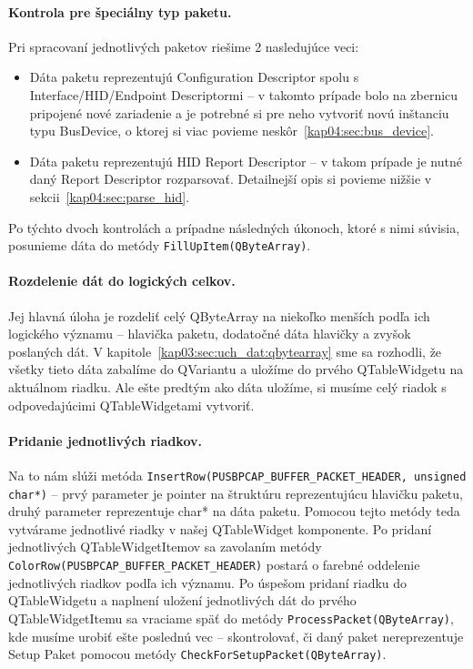 \paragraph{Kontrola pre špeciálny typ paketu.}
\hfill \break
Pri spracovaní jednotlivých paketov riešime 2 nasledujúce veci:
\begin{itemize}
\item Dáta paketu reprezentujú Configuration Descriptor spolu s Interface/HID/Endpoint Descriptormi -- v takomto prípade bolo na zbernicu pripojené nové zariadenie a je potrebné si pre neho vytvoriť novú inštanciu typu BusDevice, o ktorej si viac povieme neskôr~\ref{kap04:sec:bus_device}.
\item Dáta paketu reprezentujú HID Report Descriptor -- v takom prípade je nutné daný Report Descriptor rozparsovať. Detailnejší opis si povieme nižšie v sekcii~\ref{kap04:sec:parse_hid}.
\end{itemize}
Po týchto dvoch kontrolách a prípadne následných úkonoch, ktoré s nimi súvisia, posunieme dáta do metódy \texttt{FillUpItem(QByteArray)}.  

\paragraph{Rozdelenie dát do logických celkov.}
\hfill \break
Jej hlavná úloha je rozdeliť celý QByteArray na niekoľko menších podľa ich logického významu -- hlavička paketu, dodatočné dáta hlavičky a zvyšok poslaných dát. V kapitole~\ref{kap03:sec:uch_dat:qbytearray} sme sa rozhodli, že všetky tieto dáta zabalíme do QVariantu a uložíme do prvého QTableWidgetu na aktuálnom riadku. Ale ešte predtým ako dáta uložíme, si musíme celý riadok s odpovedajúcimi QTableWidgetami vytvoriť.

\paragraph{Pridanie jednotlivých riadkov.}
\hfill \break
Na to nám slúži metóda \texttt{InsertRow(PUSBPCAP\_BUFFER\_PACKET\_HEADER, unsigned char*)} -- prvý parameter je pointer na štruktúru reprezentujúcu hlavičku paketu, druhý parameter reprezentuje char* na dáta paketu. Pomocou tejto metódy teda vytvárame jednotlivé riadky v našej QTableWidget komponente. Po pridaní jednotlivých QTableWidgetItemov sa zavolaním metódy \texttt{ColorRow(PUSBPCAP\_BUFFER\_PACKET\_HEADER)} postará o farebné oddelenie jednotlivých riadkov podľa ich významu. Po úspešom pridaní riadku do QTableWidgetu a naplnení uložení jednotlivých dát do prvého QTableWidgetItemu sa vraciame späť do metódy \texttt{ProcessPacket(QByteArray)}, kde musíme urobiť ešte poslednú vec -- skontrolovať, či daný paket nereprezentuje Setup Paket pomocou metódy \texttt{CheckForSetupPacket(QByteArray)}. 

